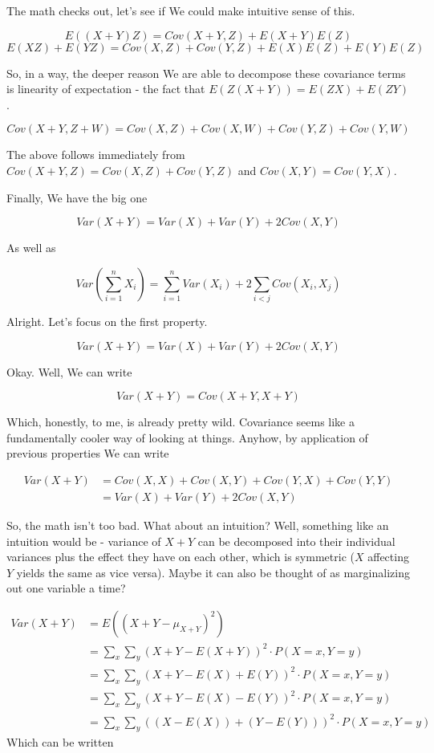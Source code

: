 \documentclass{article}
\begin{document}
		The math checks out, let's see if We could make intuitive sense of this. 
		
		\[ E((X+Y)Z) = Cov(X+Y, Z) + E(X+Y)E(Z) \]
		\[ E(XZ) + E(YZ) = Cov(X, Z) + Cov(Y, Z) + E(X)E(Z) + E(Y)E(Z) \]
		
		So, in a way, the deeper reason We are able to decompose these covariance terms is linearity of expectation - the fact that $E(Z(X+Y)) = E(ZX) + E(ZY)$.
		
		\[ Cov(X+Y, Z+W) = Cov(X, Z) + Cov(X, W) + Cov(Y, Z) + Cov(Y, W) \]
			
		The above follows immediately from $Cov(X+Y, Z) = Cov(X, Z) + Cov(Y, Z)$ and $Cov(X, Y) = Cov(Y, X)$.
		
		Finally, We have the big one
		
		\[ Var(X+Y) = Var(X) + Var(Y) +2Cov(X, Y) \]
		
		As well as
		
		\[ Var\left( \sum^n_{i=1} X_i \right) =  \sum^n_{i=1} Var(X_i) + 2\sum_{i<j} Cov(X_i, X_j) \]
			
		Alright. Let's focus on the first property. 		
		
		\[ Var(X+Y) = Var(X) + Var(Y) +2Cov(X, Y) \]
		
		Okay. Well, We can write
		
		\[ Var(X+Y) = Cov(X+Y, X+Y) \]
		
		Which, honestly, to me, is already pretty wild. Covariance seems like a fundamentally cooler way of looking at things. Anyhow, by application of previous properties We can write
		
		\begin{align*}
		 Var(X+Y) &= Cov(X, X) +Cov(X, Y) + Cov(Y, X) + Cov(Y, Y) \\
		 & = Var(X) + Var(Y) + 2Cov(X, Y)
		 \end{align*}
		 
		 So, the math isn't too bad. What about an intuition? Well, something like an intuition would be - variance of $X+Y$ can be decomposed into their individual variances plus the effect they have on each other, which is symmetric ($X$ affecting $Y$ yields the same as vice versa). Maybe it can also be thought of as marginalizing out one variable a time?
		 
		 \begin{align*}
		 	Var(X+Y) &= E((X+Y - \mu_{X+Y})^2) \\
		 	&=\sum_x \sum_y  (X+Y - E(X+Y))^2 \cdot P(X=x, Y=y) \\
		 	&=\sum_x \sum_y  (X+Y - E(X)+E(Y))^2 \cdot P(X=x, Y=y) \\
		 	&=\sum_x \sum_y  (X+Y - E(X)-E(Y))^2 \cdot P(X=x, Y=y) \\
		 	&=\sum_x \sum_y  ((X-E(X))+(Y-E(Y)))^2 \cdot P(X=x, Y=y)		 	
		 \end{align*}
		 Which can be written 
		 
\end{document}

